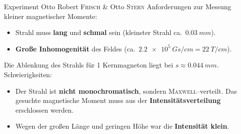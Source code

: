 \documentclass[t,9pt]{beamer}
\newcommand{\highlight}[3]{ \begin{textblock*}{#1}(#2,#3) \begin{tcolorbox} [enhanced,opacityfill=.1,colback=blue] \end{tcolorbox} \end{textblock*} } %
\begin{document}
        \begin{frame}{Experiment Otto Robert \textsc{Frisch} \& Otto \textsc{Stern}}
                Anforderungen zur Messung kleiner magnetischer Momente:\\
                \begin{itemize}
                        \item Strahl muss \textbf{lang} und \textbf{schmal} sein (kleinster Strahl ca.\ $\SI{0.03}{mm}$).
                        \item \textbf{Große Inhomogenität} des Feldes (ca.\ $\SI{2.2e+5}{Gs/cm}=\SI{22}{T/cm}$).
                \end{itemize}
                \pause
                \vspace{.5cm} Die Ablenkung des Strahls für 1 Kernmagneton liegt bei $s\approx \SI{0.044}{mm}$.
                \pause
                \\\vspace{.5cm}Schwierigkeiten:
                \begin{itemize}
                        \item Der Strahl ist \textbf{nicht monochromatisch}, sondern \textsc{Maxwell}--verteilt. Das gesuchte magnetische Moment muss aus der \textbf{Intensitätsverteilung} erschlossen werden.
                        \item Wegen der großen Länge und geringen Höhe war die \textbf{Intensität klein}.
                \end{itemize}
                \hfill\tiny\cite{FrischStern1933}\normalsize
        \end{frame}

\end{document}
